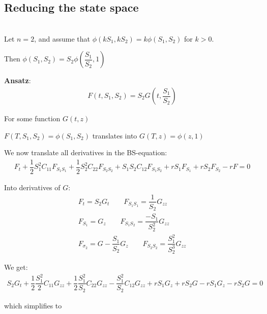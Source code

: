 \subsection{Reducing the state space}\hfill\\
\noindent Let $n=2$, and assume that $\phi(kS_1,kS_2) = k\phi(S_1,S_2)$ for $k>0$.\par
\noindent Then $\phi(S_1,S_2) = S_2\phi\left(\dfrac{S_1}{S_2},1\right)$
\par\bigskip
\noindent\textbf{Ansatz}:
\begin{equation*}
  \begin{gathered}
    F(t,S_1,S_2) = S_2G\left(t,\dfrac{S_1}{S_2}\right)
  \end{gathered}
\end{equation*}\par
\noindent For some function $G(t,z)$
\par\bigskip
\noindent $F(T,S_1,S_2) = \phi(S_1,S_2)$ translates into $G(T,z) = \phi(z,1)$\par
\noindent We now translate all derivatives in the BS-equation:
\begin{equation*}
  \begin{gathered}
    F_t+\dfrac{1}{2}S_1^2C_{11}F_{S_1S_1}+\dfrac{1}{2}S_2^2C_{22}F_{S_2S_2}+S_1S_2C_{12}F_{S_1S_2}+rS_1F_{S_1}+rS_2F_{S_2}-rF=0
  \end{gathered}
\end{equation*}\par
\noindent Into derivatives of $G:$
\begin{equation*}
  \begin{gathered}
    F_t = S_2G_t\qquad F_{S_1S_1} = \dfrac{1}{S_2}G_{zz}\\
    F_{S_1} = G_z\qquad F_{S_1S_2} = \dfrac{-S_1}{S_2^2}G_{zz}\\
    F_{\sigma_2} = G-\dfrac{S_1}{S_2}G_z\qquad F_{S_2S_2} =\dfrac{S_1^2}{S_2^3}G_{zz}
  \end{gathered}
\end{equation*}\par
\noindent We get:
\begin{equation*}
  \begin{gathered}
    S_2G_t+\dfrac{1}{2}\dfrac{S_1^2}{2}C_{11}G_{zz}+\dfrac{1}{2}\dfrac{S_1^2}{S_2}C_{22}G_{zz}-\dfrac{S_1^2}{S_2}C_{12}G_{zz}+rS_1G_z+rS_2G-rS_1G_z-rS_2G=0
  \end{gathered}
\end{equation*}\par
\noindent which simplifies to
